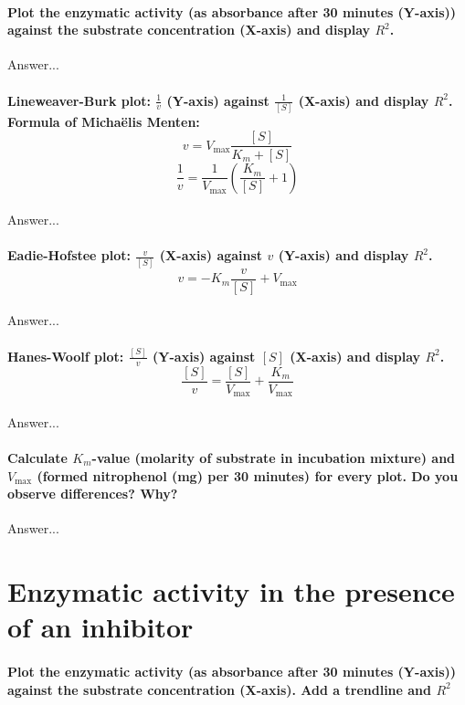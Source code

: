 \documentclass[a4paper,12pt]{article}
\begin{document}
{\paragraph{Plot the enzymatic activity (as absorbance after 30 minutes (Y-axis)) 
against the substrate concentration (X-axis) and display $R^2$.}

Answer...

\paragraph{Lineweaver-Burk plot: $\frac{1}{v}$ (Y-axis) against $\frac{1}{[S]}$ (X-axis) and display $R^2$. 
Formula of Michaëlis Menten:$$v=V_{\text{max}}\frac{[S]}{K_m+[S]}$$ $$\frac{1}{v}=\frac{1}{V_{\text{max}}}\left(\frac{K_m}{[S]}+1\right)$$}

Answer...

\paragraph{Eadie-Hofstee plot: $\frac{v}{[S]}$ (X-axis) against $v$ (Y-axis) and display $R^2$. $$v=-K_m\frac{v}{[S]}+V_{\text{max}}$$}

Answer...

\paragraph{Hanes-Woolf plot: $\frac{[S]}{v}$ (Y-axis) against $[S]$ (X-axis) and display $R^2$. $$\frac{[S]}{v}=\frac{[S]}{V_{\text{max}}}+\frac{K_m}{V_{\text{max}}}$$}

Answer...

\paragraph{Calculate $K_m$-value (molarity of substrate in incubation mixture) and $V_{\text{max}}$ (formed nitrophenol (mg) per 30 minutes) for every plot. Do you observe 
differences? Why? 
}

Answer...

\section{Enzymatic activity in the presence of an inhibitor}

\paragraph{Plot the enzymatic activity (as absorbance after 30 minutes (Y-axis)) 
against the substrate concentration (X-axis). Add a trendline and $R^2$}

}
\end{document}
